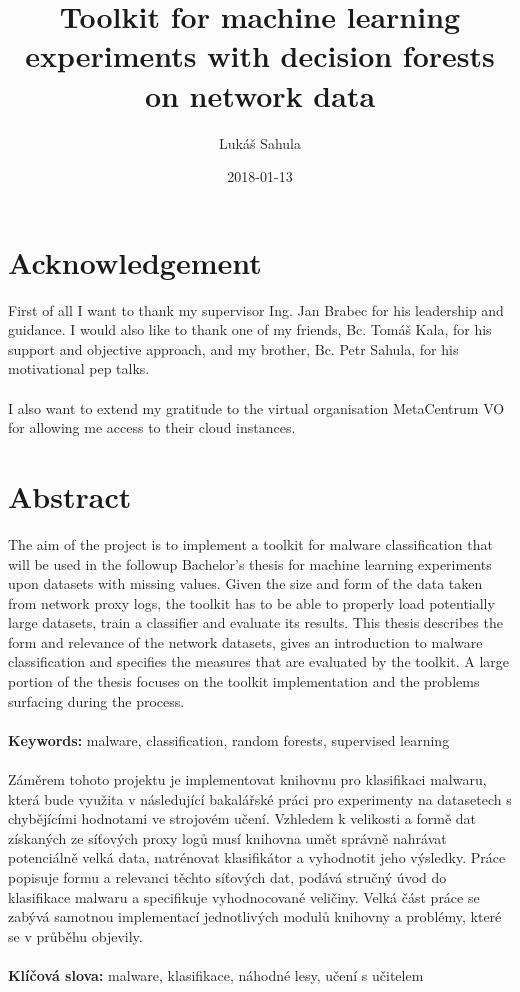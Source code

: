\documentclass[11pt]{article}
\title{Toolkit for machine learning experiments with decision forests on network data}
\date{2018-01-13}
\author{Lukáš Sahula}
\begin{document}
  \maketitle
  \newpage
  \section*{Acknowledgement}
    First of all I want to thank my supervisor Ing. Jan Brabec for his leadership and guidance. I would also like to thank one of my friends, Bc. Tomáš Kala, for his support and objective approach, and my brother, Bc. Petr Sahula, for his motivational pep talks.
    \\~\\
    I also want to extend my gratitude to the virtual organisation MetaCentrum VO for allowing me access to their cloud instances.
  \newpage
  \section*{Abstract}
    The aim of the project is to implement a toolkit for malware classification that will be used in the followup Bachelor's thesis for machine learning experiments upon datasets with missing values. Given the size and form of the data taken from network proxy logs, the toolkit has to be able to properly load potentially large datasets, train a classifier and evaluate its results. This thesis describes the form and relevance of the network datasets, gives an introduction to malware classification and specifies the measures that are evaluated by the toolkit. A large portion of the thesis focuses on the toolkit implementation and the problems surfacing during the process.
    \\~\\
    {\bf Keywords:} malware, classification, random forests, supervised learning 
    \\~\\
    Záměrem tohoto projektu je implementovat knihovnu pro klasifikaci malwaru, která bude využita v následující bakalářské práci pro experimenty na datasetech s chybějícími hodnotami ve strojovém učení. Vzhledem k velikosti a formě dat získaných ze síťových proxy logů musí knihovna umět správně nahrávat potenciálně velká data, natrénovat klasifikátor a vyhodnotit jeho výsledky. Práce popisuje formu a relevanci těchto síťových dat, podává stručný úvod do klasifikace malwaru a specifikuje vyhodnocované veličiny. Velká část práce se zabývá samotnou implementací jednotlivých modulů knihovny a problémy, které se v průběhu objevily.
    \\~\\
    {\bf Klíčová slova:} malware, klasifikace, náhodné lesy, učení s učitelem 
  \newpage
  \tableofcontents
  \newpage
\end{document}
